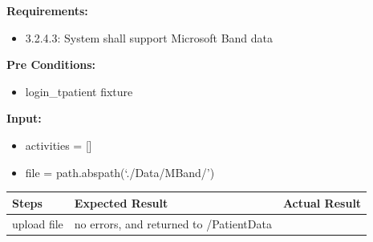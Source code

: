 \documentclass[letterpaper,10pt,english]{sphinxmanual}
\begin{document}
\begin{fulllineitems}
\label{STD/test_upload:test_upload.test_mband_data_upload}
\textbf{Requirements:}
\begin{itemize}
\item {} 
3.2.4.3: System shall support Microsoft Band data

\end{itemize}

\textbf{Pre Conditions:}
\begin{itemize}
\item {} 
login\_tpatient fixture

\end{itemize}

\textbf{Input:}
\begin{itemize}
\item {} 
activities = {[}{]}

\item {} 
file = path.abspath(`./Data/MBand/')

\end{itemize}

\begin{tabulary}{\linewidth}{|L|L|L|}
\hline
\textsf{\relax 
Steps
} & \textsf{\relax 
Expected Result
} & \textsf{\relax 
Actual Result
}\\
\hline
upload file
 & 
no errors, and returned to /PatientData
 & \\
\hline\end{tabulary}


\end{fulllineitems}

\end{document}
